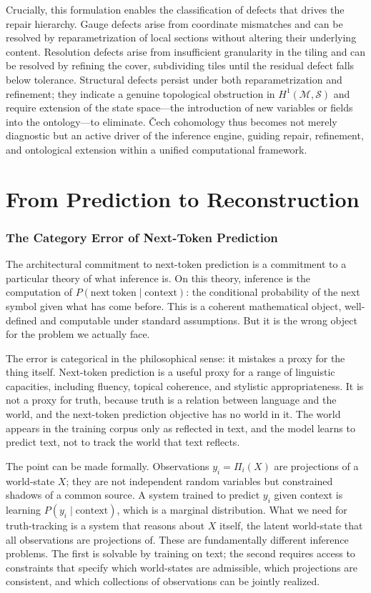 \documentclass[11pt, oneside]{article}
\begin{document}
Crucially, this formulation enables the classification of defects that drives the repair hierarchy. Gauge defects arise from coordinate mismatches and can be resolved by reparametrization of local sections without altering their underlying content. Resolution defects arise from insufficient granularity in the tiling and can be resolved by refining the cover, subdividing tiles until the residual defect falls below tolerance. Structural defects persist under both reparametrization and refinement; they indicate a genuine topological obstruction in $H^1(\mathcal{M}, \mathcal{S})$ and require extension of the state space---the introduction of new variables or fields into the ontology---to eliminate. \v{C}ech cohomology thus becomes not merely diagnostic but an active driver of the inference engine, guiding repair, refinement, and ontological extension within a unified computational framework.

\part{From Prediction to Reconstruction}

\section{The Category Error of Next-Token Prediction}

The architectural commitment to next-token prediction is a commitment to a particular theory of what inference is. On this theory, inference is the computation of $P(\mathrm{next\ token} \mid \mathrm{context})$: the conditional probability of the next symbol given what has come before. This is a coherent mathematical object, well-defined and computable under standard assumptions. But it is the wrong object for the problem we actually face.

The error is categorical in the philosophical sense: it mistakes a proxy for the thing itself. Next-token prediction is a useful proxy for a range of linguistic capacities, including fluency, topical coherence, and stylistic appropriateness. It is not a proxy for truth, because truth is a relation between language and the world, and the next-token prediction objective has no world in it. The world appears in the training corpus only as reflected in text, and the model learns to predict text, not to track the world that text reflects.

The point can be made formally. Observations $y_i = \Pi_i(X)$ are projections of a world-state $X$; they are not independent random variables but constrained shadows of a common source. A system trained to predict $y_i$ given context is learning $P(y_i \mid \mathrm{context})$, which is a marginal distribution. What we need for truth-tracking is a system that reasons about $X$ itself, the latent world-state that all observations are projections of. These are fundamentally different inference problems. The first is solvable by training on text; the second requires access to constraints that specify which world-states are admissible, which projections are consistent, and which collections of observations can be jointly realized.
\end{document}
